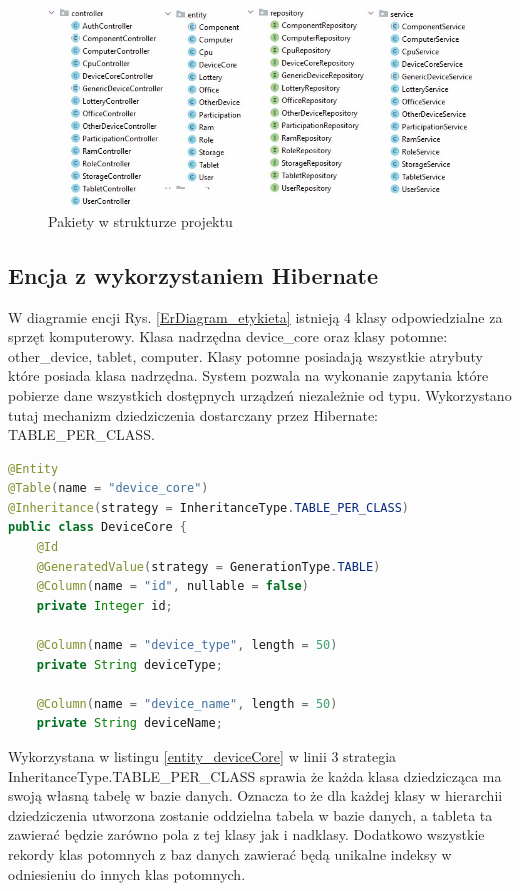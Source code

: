\begin{figure}[h]
    \includegraphics[scale=1.0]{rys05/pakiety.jpg}
    \caption{Pakiety w strukturze projektu}
    \label{pakiety_etykieta}
\end{figure}

\newpage
\subsection {Encja z wykorzystaniem Hibernate}

W diagramie encji Rys. \ref{ErDiagram_etykieta} istnieją 4 klasy odpowiedzialne za sprzęt komputerowy. Klasa nadrzędna device\_core oraz klasy potomne: other\_device, tablet, computer. Klasy potomne posiadają wszystkie atrybuty które posiada klasa nadrzędna. System pozwala na wykonanie zapytania które pobierze dane wszystkich dostępnych urządzeń niezależnie od typu. Wykorzystano tutaj mechanizm dziedziczenia dostarczany przez Hibernate: TABLE\_PER\_CLASS.

\begin{lstlisting}[language=Java, style=JavaStyle, caption={Fragment klasy nadrzędnej DeviceCore}, label={entity_deviceCore}]
@Entity
@Table(name = "device_core")
@Inheritance(strategy = InheritanceType.TABLE_PER_CLASS)
public class DeviceCore {
    @Id
    @GeneratedValue(strategy = GenerationType.TABLE)
    @Column(name = "id", nullable = false)
    private Integer id;

    @Column(name = "device_type", length = 50)
    private String deviceType;

    @Column(name = "device_name", length = 50)
    private String deviceName;

\end{lstlisting}

Wykorzystana w listingu \ref{entity_deviceCore} w linii 3 strategia InheritanceType.TABLE\_PER\_CLASS sprawia że każda klasa dziedzicząca ma swoją własną tabelę  w bazie danych. Oznacza to że dla każdej klasy w hierarchii dziedziczenia utworzona zostanie oddzielna tabela w bazie danych, a tableta ta zawierać będzie zarówno pola z tej klasy jak i nadklasy. Dodatkowo wszystkie rekordy klas potomnych z baz danych zawierać będą unikalne indeksy w odniesieniu do innych klas potomnych.

